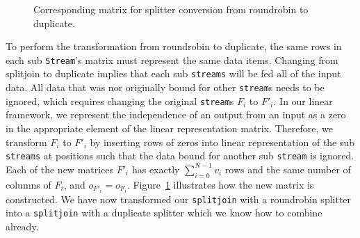 \begin{figure}
\center
\epsfxsize=3.0in
\caption{Corresponding matrix for splitter conversion from roundrobin to duplicate.}
\label{fig:splitjoin-roundrobin-matrix}
\end{figure}

To perform the transformation from roundrobin to duplicate, the same rows
in each sub {\tt Stream}'s matrix must represent the same data items. Changing from splitjoin to 
duplicate implies that each sub {\tt streams} will be fed all of the input data. All data
that was nor originally bound for other {\tt stream}s needs to be ignored, which requires
changing the original {\tt stream}s $F_i$ to $F'_i$. In our linear
framework, we represent the independence of an output from an input as a zero in the appropriate
element of the linear representation matrix. Therefore, we transform $F_i$ to $F'_i$ by inserting
rows of zeros into linear representation of the sub {\tt streams} at positions such that
the data bound for another sub {\tt stream} is ignored. Each of the new matrices $F'_i$ 
has exactly $\sum_{i=0}^{N-1}v_i$ rows and the same number of columns of $F_i$, and 
$o_{F'_i}=o_{F_i}$.
Figure~\ref{fig:splitjoin-roundrobin-matrix} illustrates how the new matrix is constructed.
We have now transformed our {\tt splitjoin} with a roundrobin splitter into a {\tt splitjoin}
with a duplicate splitter which we know how to combine already.
